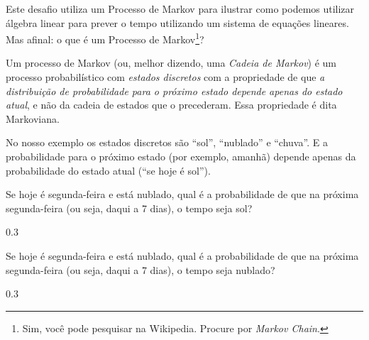\documentclass[pdftex, brazil, 12pt, oneside, addpoints]{exam}
\begin{document}
\begin{questions}
\question
Este desafio utiliza um Processo de Markov para ilustrar como podemos utilizar
álgebra linear para prever o tempo utilizando um sistema de equações
lineares. Mas afinal: o que é um Processo de Markov\footnote{Sim, você
pode pesquisar na Wikipedia. Procure por \emph{Markov Chain}.}?
\begin{solutionorlines}[0.75in]
  Um processo de Markov (ou, melhor dizendo, uma \emph{Cadeia de
    Markov}) é um processo probabilístico com \emph{estados discretos}
  com a propriedade de que \emph{a
  distribuição de probabilidade para o próximo estado depende apenas
  do estado atual}, e não da cadeia de estados que o precederam. Essa
  propriedade é dita Markoviana.

  No nosso exemplo os estados discretos são ``sol'', ``nublado'' e
  ``chuva''. E a probabilidade para o próximo estado (por exemplo,
  amanhã) depende apenas da probabilidade do estado atual (``se hoje é
  sol'').
\end{solutionorlines}



\question
Se hoje é segunda-feira e está nublado, qual é a probabilidade de que
na próxima segun\-da-feira (ou seja, daqui a 7 dias), o tempo seja sol?
\begin{solutionorlines}[0.25in]
  $0.3$
\end{solutionorlines}

\question
Se hoje é segunda-feira e está nublado, qual é a probabilidade de que
na próxima segun\-da-feira (ou seja, daqui a 7 dias), o tempo seja nublado?
\begin{solutionorlines}[0.25in]
  $0.3$
\end{solutionorlines}


\end{questions}
\end{document}
